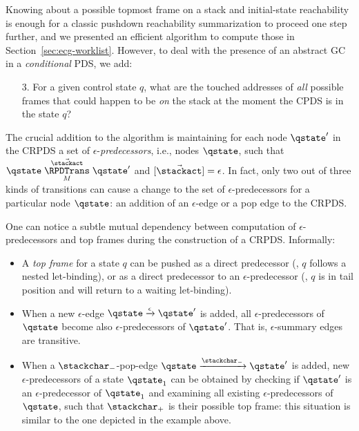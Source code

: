 Knowing about a possible topmost frame on a stack and initial-state
reachability is enough for a classic pushdown reachability
summarization to proceed one step further, and we presented an
efficient algorithm to compute those in
Section~\ref{sec:ecg-worklist}.
However, to deal with the presence of an abstract GC in a
\emph{conditional} PDS, we add:

\begin{enumerate}
\item[3.] For a given control state $q$, what are the touched addresses of \emph{all} possible frames
that could happen to be \emph{on} the stack  at the moment the CPDS
is in the state $q$?
\end{enumerate}








The crucial addition to the algorithm is maintaining for each node
$\qstate'$ in the CRPDS a set of $\epsilon$-\emph{predecessors}, i.e.,
nodes $\qstate$, such that $\qstate \mathrel{\overset{\vec{\stackact}}{\underset{M}{\RPDTrans}}}
\qstate'$ and $[\vec{\stackact}] = \epsilon$.
In fact, only two out of three kinds
of transitions can cause a change to the set of
$\epsilon$-predecessors for a particular node $\qstate$: an addition of
an $\epsilon$-edge or a pop edge to the CRPDS. 




One can notice a subtle mutual dependency between computation of
$\epsilon$-predecessors and top frames during the construction of a
CRPDS.
Informally:

\begin{itemize}
\item A \emph{top frame} for a state $q$ can be pushed as a direct
  predecessor (\eg, $q$ follows a nested let-binding), or as a direct
  predecessor to an $\epsilon$-predecessor (\eg, $q$ is in tail
  position and will return to a waiting let-binding).

\item When a new $\epsilon$-edge $\qstate \xrightarrow{\epsilon}
  \qstate'$ is added, all $\epsilon$-predecessors of $\qstate$ become
  also $\epsilon$-predecessors of $\qstate'$. 
That is, $\epsilon$-summary edges are transitive.

 
\item When a $\stackchar_-$-pop-edge $\qstate
  \xrightarrow{\stackchar_-} \qstate'$ is added, new
  $\epsilon$-predecessors of a state $\qstate_1$ can be obtained by
  checking if $\qstate'$ is an $\epsilon$-predecessor of $\qstate_1$
  and examining all existing $\epsilon$-predecessors of $\qstate$,
  such that $\stackchar_+$ is their possible top frame: this situation
  is similar to the one depicted in the example above. 

\end{itemize}

